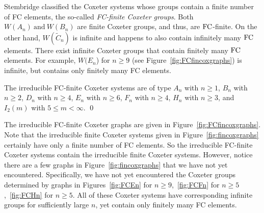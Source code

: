Stembridge classified the Coxeter systems whose groups contain a finite number of FC elements, the so-called \emph{FC-finite Coxeter groups}. Both $W(A_n)~\mathrm{and}~W(B_n)$ are finite Coxeter groups, and thus, are $\mathrm{FC}$-finite. On the other hand, $W(\widetilde{C}_n)$ is infinite and happens to also contain infinitely many $\mathrm{FC}$ elements. There exist infinite Coxeter groups that contain finitely many $\mathrm{FC}$ elements. For example, $W(E_n$) for $n \geq 9$ (see Figure~\ref{fig:FCfincoxgraphs}) is infinite, but contains only finitely many FC elements.

\begin{proposition}
\label{thm:FCfinite} The irreducible FC-finite Coxeter systems are of type $A_n$ with $n \geq 1$, $B_n$ with $n \geq 2$, $D_n$ with $n \geq 4$, $E_n$ with $n \geq 6$, $F_n$ with $n \geq 4$, $H_n$ with $n \geq 3$, and $I_2(m)$ with $5 \leq m < \infty$. \qed
\end{proposition} 
 
The irreducible FC-finite Coxeter graphs are given in Figure~\ref{fig:FCfincoxgraphs}. Note that the irreducible finite Coxeter systems given in Figure~\ref{fig:fincoxgraphs} certainly have only a finite number of FC elements. So the irreducible FC-finite Coxeter systems contain the irreducible finite Coxeter systems. However, notice there are a few graphs in Figure~\ref{fig:fincoxgraphs} that we have not yet encountered. Specifically, we have not yet encountered the Coxeter groups determined by graphs in Figures~\ref{fig:FCEn} for $n \geq 9$,~\ref{fig:FCFn} for $n \geq 5$,~\ref{fig:FCHn} for $n \geq 5$. All of these Coxeter systems have corresponding infinite groups for sufficiently large $n$, yet contain only finitely many FC elements.

